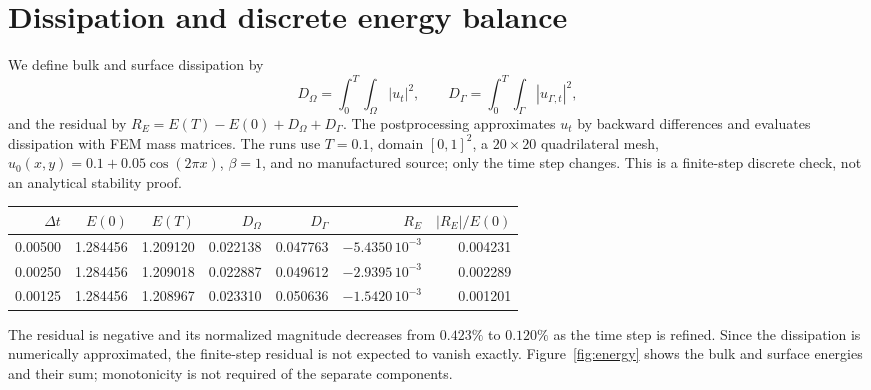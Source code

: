 \documentclass[10pt,a4paper]{article}
\begin{document}
\section{Dissipation and discrete energy balance}
We define bulk and surface dissipation by
\[
 D_\Omega=\int_0^T\!\int_\Omega|u_t|^2,\qquad
 D_\Gamma=\int_0^T\!\int_\Gamma|u_{\Gamma,t}|^2,
\]
and the residual by $R_E=E(T)-E(0)+D_\Omega+D_\Gamma$. The postprocessing approximates $u_t$ by backward differences and evaluates dissipation with FEM mass matrices. The runs use $T=0.1$, domain $[0,1]^2$, a $20\times20$ quadrilateral mesh, $u_0(x,y)=0.1+0.05\cos(2\pi x)$, $\beta=1$, and no manufactured source; only the time step changes. This is a finite-step discrete check, not an analytical stability proof.
\begin{center}\small
\begin{tabular}{rrrrrrr}
\toprule
$\Delta t$&$E(0)$&$E(T)$&$D_\Omega$&$D_\Gamma$&$R_E$&$|R_E|/E(0)$\\
\midrule
0.00500&1.284456&1.209120&0.022138&0.047763&$-5.4350\,10^{-3}$&0.004231\\
0.00250&1.284456&1.209018&0.022887&0.049612&$-2.9395\,10^{-3}$&0.002289\\
0.00125&1.284456&1.208967&0.023310&0.050636&$-1.5420\,10^{-3}$&0.001201\\
\bottomrule
\end{tabular}
\end{center}
The residual is negative and its normalized magnitude decreases from $0.423\%$ to $0.120\%$ as the time step is refined. Since the dissipation is numerically approximated, the finite-step residual is not expected to vanish exactly. Figure~\ref{fig:energy} shows the bulk and surface energies and their sum; monotonicity is not required of the separate components.
\end{document}
